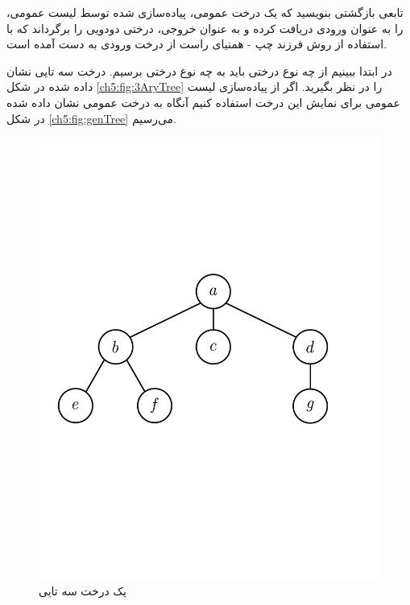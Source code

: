  تابعی بازگشتی بنویسید که یک درخت عمومی، پیاده‌سازی شده توسط لیست عمومی، را به عنوان ورودی دریافت کرده و به عنوان خروجی، درختی دودویی را برگرداند که با استفاده از روش فرزند چپ - همنیای راست از درخت ورودی به دست آمده است.


در ابتدا ببینیم از چه نوع درختی باید به چه نوع درختی برسیم. درخت سه تایی نشان داده شده در شکل {\eqref{ch5:fig:3AryTree}} را در نظر بگیرید. اگر از پیاده‌سازی لیست عمومی برای نمایش این درخت استفاده کنیم آنگاه به درخت عمومی نشان داده شده در شکل {\eqref{ch5:fig:genTree}} می‌رسیم.

\begin{figure}[H]
\begin{center}
\includegraphics[scale=0.33]{figs/ch5/three_ary_tree.pdf}
\caption{یک درخت سه تایی}\label{ch5:fig:3AryTree}
\end{center}
\end{figure}

